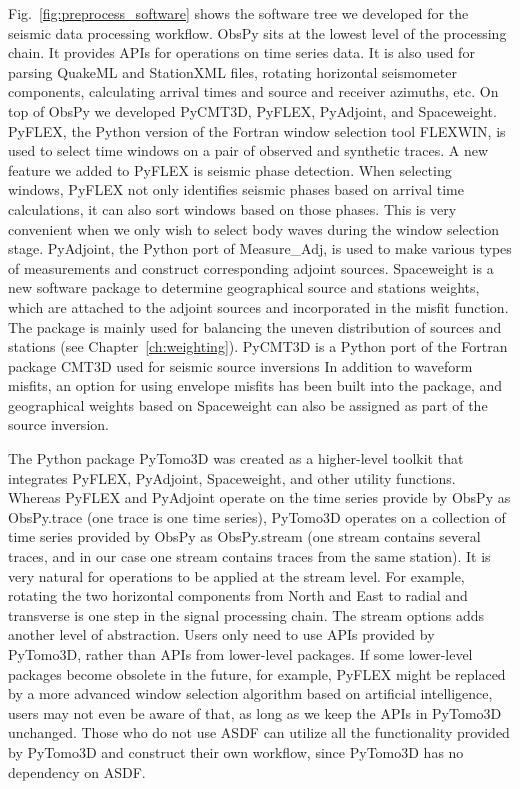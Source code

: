 Fig.~\ref{fig:preprocess_software} shows the software tree we developed
for the seismic data processing workflow.
ObsPy sits at the lowest level of the processing chain.
It provides APIs for operations on time series data. It is also used for
parsing QuakeML and StationXML files, rotating horizontal seismometer components, calculating arrival times and source and receiver azimuths, etc.
On top of ObsPy we developed PyCMT3D, PyFLEX, PyAdjoint, and Spaceweight.
PyFLEX, the Python version of the Fortran window selection tool FLEXWIN, is used to select time windows on a pair of observed
and synthetic traces.
A new feature we added to PyFLEX is seismic
phase detection.
When selecting windows, PyFLEX not only identifies seismic phases
based on arrival time calculations, it can also sort windows based on those phases.
This is very convenient when we only wish to select body waves during the window selection stage.
PyAdjoint, the Python port of Measure\_Adj, is used to make
various types of measurements and construct corresponding adjoint sources.
Spaceweight is a new software package to determine geographical source and stations weights,
which are attached to the adjoint sources and incorporated in the misfit function.
The package is mainly used for
balancing the uneven distribution of sources and stations (see Chapter~\ref{ch:weighting}).
PyCMT3D is a Python port of the Fortran package CMT3D used for seismic source inversions
In addition
to waveform misfits, an option for using envelope misfits has been built into the package,
and geographical weights based on Spaceweight can also be assigned as part of the source inversion.

The Python package PyTomo3D was created as a higher-level toolkit that integrates
PyFLEX, PyAdjoint, Spaceweight, and other utility functions.
Whereas PyFLEX and PyAdjoint operate on the time series provide by ObsPy as
ObsPy.trace (one trace is one time series),
PyTomo3D operates on a collection of time series provided by ObsPy as ObsPy.stream (one stream contains several traces, and in our case one stream
contains traces from the same station).
It is very natural for operations to be
applied at the stream level.
For example, rotating the two horizontal components 
from North and East to radial and transverse is one step in the signal processing
chain.
The stream options adds another level of abstraction.
Users only need to use APIs provided by PyTomo3D,
rather than APIs from lower-level packages.
If some lower-level packages become obsolete in the future, for example, PyFLEX might be
replaced by a more advanced window selection algorithm based on artificial intelligence,
users may not even be aware of that, as long as we keep the APIs in PyTomo3D unchanged. 
Those who do not use ASDF can utilize all the functionality provided by
PyTomo3D and construct their own workflow, since PyTomo3D has no dependency on ASDF.

